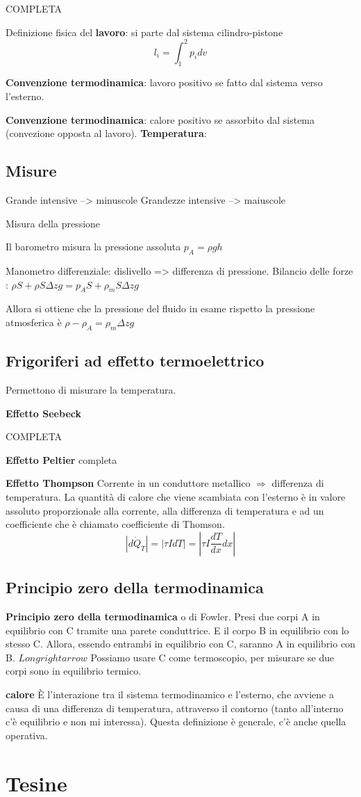 \documentclass[a4paper]{article}
\begin{document}
COMPLETA 

Definizione fisica del \textbf{lavoro}: si parte dal sistema cilindro-pistone \begin{equation}
	l_i=\int_1^2 p_idv
\end{equation}

\textbf{Convenzione termodinamica}: lavoro positivo se fatto dal sistema verso l'esterno.

\textbf{Convenzione termodinamica}: calore positivo se assorbito dal sistema (convezione opposta al lavoro).
\textbf{Temperatura}:



\subsection{Misure}

Grande intensive --> minuscole
Grandezze intensive --> maiuscole

Misura della pressione 

Il barometro misura la pressione assoluta $p_A=\rho g h$

Manometro differenziale: dislivello => differenza di pressione. Bilancio delle forze : $ \rho S+\rho S\Delta z g=p_AS+\rho_m S\Delta z g$
 
Allora si ottiene che la pressione del fluido in esame rispetto la pressione atmosferica è $\rho -\rho_A=\rho_m \Delta zg$ 

\subsection{Frigoriferi ad effetto termoelettrico}


Permettono di misurare la temperatura. 

\textbf{Effetto Seebeck}

COMPLETA

\textbf{Effetto Peltier} completa


\textbf{Effetto Thompson} 
Corrente in un conduttore metallico $\Longrightarrow$ differenza di temperatura. La quantità di calore che viene scambiata con l’esterno è in valore
assoluto proporzionale alla corrente, alla differenza di temperatura e ad un coefficiente che è chiamato coefficiente di Thomson.
$$\left|d \dot{Q}_{T}\right|=|\tau I d T|=\left|\tau I \frac{d T}{d x} d x\right|$$ 

\subsection{Principio zero della termodinamica}
\textbf{Principio zero della termodinamica} o di Fowler. Presi due corpi A in equilibrio con C tramite una parete conduttrice. E il corpo B in equilibrio con lo stesso C. Allora, essendo entrambi in equilibrio con C, saranno A in equilibrio con B. $Longrightarrow$ Possiamo usare C come termoscopio, per misurare se due corpi sono in equilibrio termico. 

\textbf{calore}
È l’interazione tra il sistema termodinamico e l’esterno, che avviene a causa di una differenza di temperatura, attraverso il contorno (tanto all’interno c’è equilibrio e non mi interessa). Questa definizione è generale, c'è anche quella operativa. 


\newpage
\section{Tesine}
\end{document}
